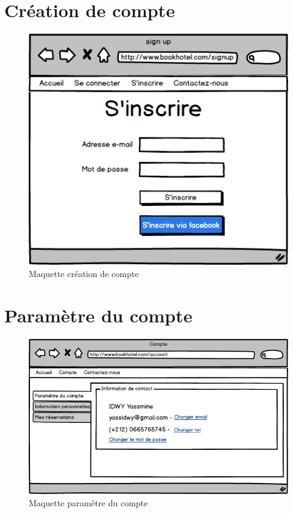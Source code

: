 \documentclass[12pt,a4paper]{report}
\begin{document}
	\newpage 

	\section{Création de compte}
	\begin{figure}[!hbtp]
		\centering
		\includegraphics[scale=0.5]{./graphics/2.png}
		\caption{Maquette création de compte}
	\end{figure}

		
	
	\section{Paramètre du compte}
	\begin{figure}[!hbtp]
		\centering
		\includegraphics[scale=0.5]{./graphics/6.png}
		\caption{Maquette paramètre du compte}
	\end{figure}
	
\end{document}
